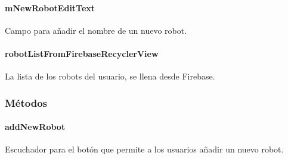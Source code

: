 \paragraph{mNewRobotEditText}
\label{\detokenize{dev_docs:mnewrobotedittext}}

\begin{fulllineitems}
\label{\detokenize{dev_docs:com.lar.cloudnao.SelectRobotActivity.mNewRobotEditText}}
Campo para añadir el nombre de un nuevo robot.

\end{fulllineitems}



\paragraph{robotListFromFirebaseRecyclerView}
\label{\detokenize{dev_docs:robotlistfromfirebaserecyclerview}}

\begin{fulllineitems}
\label{\detokenize{dev_docs:com.lar.cloudnao.SelectRobotActivity.robotListFromFirebaseRecyclerView}}
La lista de los robots del usuario, se llena desde Firebase.

\end{fulllineitems}



\subsubsection{Métodos}
\label{\detokenize{dev_docs:id3}}

\paragraph{addNewRobot}
\label{\detokenize{dev_docs:addnewrobot}}

\begin{fulllineitems}
\label{\detokenize{dev_docs:com.lar.cloudnao.SelectRobotActivity.addNewRobot()}}
Escuchador para el botón que permite a los usuarios añadir un nuevo robot.

\end{fulllineitems}



